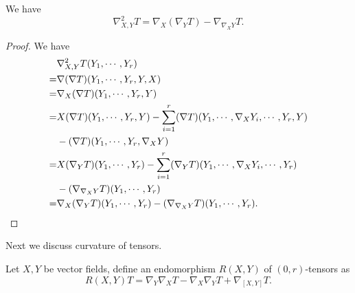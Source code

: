 \begin{prop}
    We have
    \begin{equation}
        \nabla^2_{X,Y}T=\nabla_X(\nabla_YT)-\nabla_{\nabla_XY}T.\label{2nd cov}
    \end{equation}
\end{prop}
\begin{proof}
    We have
    \begin{align*}
        &\nabla^2_{X,Y}T(Y_1,\cdots,Y_r)\\
        =&\nabla(\nabla T)(Y_1,\cdots,Y_r,Y,X)\\
        =&\nabla_X(\nabla T)(Y_1,\cdots,Y_r,Y)\\
        =&X(\nabla T)(Y_1,\cdots,Y_r,Y)-\sum_{i=1}^r(\nabla T)(Y_1,\cdots,\nabla_XY_i,\cdots,Y_r,Y)\\
        &-(\nabla T)(Y_1,\cdots,Y_r,\nabla_XY)\\
        =&X(\nabla_YT)(Y_1,\cdots,Y_r)-\sum_{i=1}^r(\nabla_YT)(Y_1,\cdots,\nabla_XY_i,\cdots,Y_r)\\
        &-(\nabla_{\nabla_XY}T)(Y_1,\cdots,Y_r)\\
        =&\nabla_X(\nabla_YT)(Y_1,\cdots,Y_r)-(\nabla_{\nabla_XY}T)(Y_1,\cdots,Y_r).\qedhere
    \end{align*}
\end{proof}

Next we discuss curvature of tensors.

\begin{defn}
    Let $X,Y$ be vector fields, define an endomorphism $R(X,Y)$ of $(0,r)$-tensors as
    \[R(X,Y)T=\nabla_Y\nabla_XT-\nabla_X\nabla_YT+\nabla_{[X,Y]}T.\]
\end{defn}

